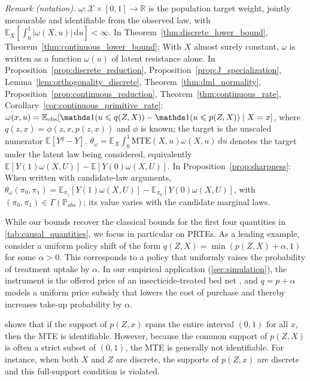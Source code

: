 \noindent\textit{Remark (notation).} $\omega:\mathcal X\times[0,1]\to\mathbb R$ is the population target weight, jointly measurable and identifiable from the observed law, with $\mathbb E_X[\int_0^1|\omega(X,u)|\,\mathrm du]<\infty$. In Theorem~\ref{thm:discrete_lower_bound}, Theorem~\ref{thm:continuous_lower_bound}: With $X$ almost surely constant, $\omega$ is written as a function $\omega(u)$ of latent resistance alone. In Proposition~\ref{prop:discrete_reduction}, Proposition~\ref{prop:J_specialization}, Lemma~\ref{lem:orthogonality_discrete}, Theorem~\ref{thm:dml_normality}, Proposition~\ref{prop:continuous_reduction}, Theorem~\ref{thm:continuous_rate}, Corollary~\ref{cor:continuous_primitive_rate}: $\omega(x,u)=\mathbb E_{\mathrm{obs}}[\indicator(u\leqslant q(Z,X))-\indicator(u\leqslant p(Z,X))\mid X=x]$, where $q(z,x)=\phi(z,x,p(z,x))$ and $\phi$ is known; the target is the unscaled numerator $\mathbb E[Y^q-Y]$. $\theta_\omega=\mathbb E_X\int_0^1\text{MTE}(X,u)\omega(X,u)\,\mathrm du$ denotes the target under the latent law being considered, equivalently $\mathbb E[Y(1)\omega(X,U)]-\mathbb E[Y(0)\omega(X,U)]$. In Proposition~\ref{prop:sharpness}: When written with candidate-law arguments, $\theta_\omega(\pi_0,\pi_1)=\mathbb E_{\pi_1}[Y(1)\omega(X,U)]-\mathbb E_{\pi_0}[Y(0)\omega(X,U)]$, with $(\pi_0,\pi_1)\in\Gamma(\mathbb P_{obs})$; its value varies with the candidate marginal laws.


While our bounds recover the classical bounds for the first four quantities in \cref{tab:causal_quantities}, we focus in particular on PRTEs. As a leading example, consider a uniform policy shift of the form $q(Z,X) = \min(p(Z,X) + \alpha, 1)$ for some $\alpha > 0$. This corresponds to a policy that uniformly raises the probability of treatment uptake by $\alpha$. In our empirical application (\cref{sec:simulation}), the instrument is the offered price of an insecticide-treated bed net \citep{dupas2014subsidies}, and $q = p + \alpha$ models a uniform price subsidy that lowers the cost of purchase and thereby increases take-up probability by $\alpha$.

\citet{heckman2001instrumental} shows that if the support of $p(Z,x)$ spans the entire interval $(0,1)$ for all $x$, then the MTE is identifiable. However, because the common support of $p(Z,X)$ is often a strict subset of $(0,1)$, the MTE is generally not identifiable. For instance, when both $X$ and $Z$ are discrete, the supports of $p(Z,x)$ are discrete and this full-support condition is violated.


